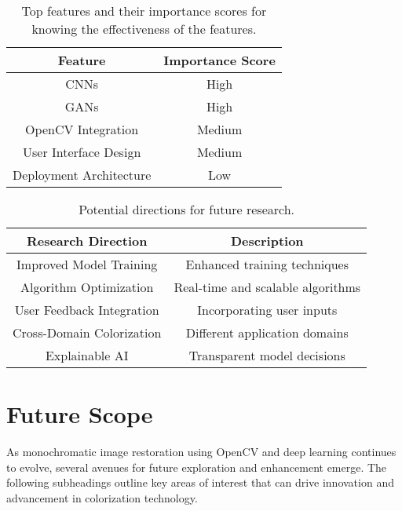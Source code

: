 \begin{table}[H]
    \centering
    \begin{tabular}{|c|c|}
        \hline
        \textbf{Feature} & \textbf{Importance Score} \\
        \hline
        CNNs & High \\
        \hline
        GANs & High \\
        \hline
        OpenCV Integration & Medium \\
        \hline
        User Interface Design & Medium \\
        \hline
        Deployment Architecture & Low \\
        \hline
    \end{tabular}
    \caption{Top features and their importance scores for knowing the effectiveness of the features.}
    \label{table:features}
\end{table}

\begin{table}[H]
    \centering
    \begin{tabular}{|c|c|}
        \hline
        \textbf{Research Direction} & \textbf{Description} \\
        \hline
        Improved Model Training & Enhanced training techniques \\
        \hline
        Algorithm Optimization & Real-time and scalable algorithms \\
        \hline
        User Feedback Integration & Incorporating user inputs \\
        \hline
        Cross-Domain Colorization & Different application domains \\
        \hline
        Explainable AI & Transparent model decisions \\
        \hline
    \end{tabular}
    \caption{Potential directions for future research.}
    \label{table:future}
\end{table}

\section{Future Scope}

As monochromatic image restoration using OpenCV and deep learning continues to evolve, several avenues for future exploration and enhancement emerge. The following subheadings outline key areas of interest that can drive innovation and advancement in colorization technology.

